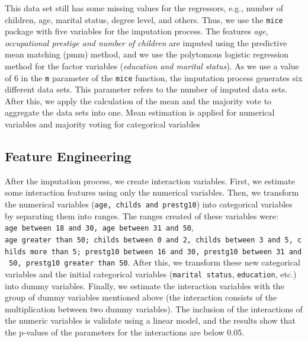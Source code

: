 \documentclass[11pt,a4paper]{article}
\begin{document}
This data set still has some missing values for the regressors, e.g.,
number of children, age, marital status, degree level, and others. Thus,
we use the \texttt{mice} package with five variables for the imputation
process. The features \emph{age, occupational prestige and number of
children} are imputed using the predictive mean matching (pmm) method,
and we use the polytomous logistic regression method for the factor
variables (\emph{education and marital status}). As we use a value of 6
in the \texttt{m} parameter of the \texttt{mice} function, the
imputation process generates six different data sets. This parameter
refers to the number of imputed data sets. After this, we apply the
calculation of the mean and the majority vote to aggregate the data sets
into one. Mean estimation is applied for numerical variables and
majority voting for categorical variables

\hypertarget{feature-engineering}{%
\subsection{Feature Engineering}\label{feature-engineering}}

After the imputation process, we create interaction variables. First, we
estimate some interaction features using only the numerical variables.
Then, we transform the numerical variables
(\texttt{age,\ childs\ and\ prestg10}) into categorical variables by
separating them into ranges. The ranges created of these variables were:
\texttt{age\ between\ 18\ and\ 30,\ age\ between\ 31\ and\ 50},
\texttt{age\ greater\ than\ 50;\ childs\ between\ 0\ and\ 2,\ childs\ between\ 3\ and\ 5,\ childs\ more\ than\ 5;\ prestg10\ between\ 16\ and\ 30,\ prestg10\ between\ 31\ and\ 50,\ prestg10\ greater\ than\ 50}.
After this, we transform these new categorical variables and the initial
categorical variables (\texttt{marital\ status}, \texttt{education},
etc.) into dummy variables. Finally, we estimate the interaction
variables with the group of dummy variables mentioned above (the
interaction consists of the multiplication between two dummy variables).
The inclusion of the interactions of the numeric variables is validate
using a linear model, and the results show that the p-values of the
parameters for the interactions are below 0.05.
\end{document}
